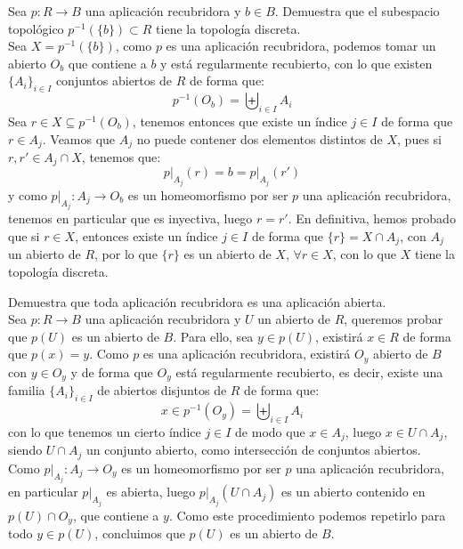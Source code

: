\begin{ejercicio}\label{ej:1_top_triv}
    Sea $p:R\to B$ una aplicación recubridora y $b\in B$. Demuestra que el subespacio topológico $p^{-1}(\{b\})\subset R$ tiene la topología discreta.\\

    \noindent
    Sea $X = p^{-1}(\{b\})$, como $p$ es una aplicación recubridora, podemos tomar un abierto $O_b$ que contiene a $b$ y está regularmente recubierto, con lo que existen $\{A_i\}_{i \in I}$ conjuntos abiertos de $R$ de forma que:
    \begin{equation*}
        p^{-1}(O_b) = \biguplus_{i \in I}A_i
    \end{equation*}
    Sea $r\in X\subseteq p^{-1}(O_b)$, tenemos entonces que existe un índice $j\in I$ de forma que $r\in A_j$. Veamos que $A_j$ no puede contener dos elementos distintos de $X$, pues si $r,r'\in A_j\cap X$, tenemos que:
    \begin{equation*}
        p\big|_{A_j}(r) = b = p\big|_{A_j}(r') 
    \end{equation*}
    y como $p\big|_{A_j}:A_j\to O_b$ es un homeomorfismo por ser $p$ una aplicación recubridora, tenemos en particular que es inyectiva, luego $r = r'$. En definitiva, hemos probado que si $r\in X$, entonces existe un índice $j\in I$ de forma que $\{r\} = X\cap A_j$, con $A_j$ un abierto de $R$, por lo que $\{r\}$ es un abierto de $X$, $\forall r\in X$, con lo que $X$ tiene la topología discreta.
\end{ejercicio}

\begin{ejercicio}\label{ej:1_recubridora_abierta}
    Demuestra que toda aplicación recubridora es una aplicación abierta.\\

    \noindent
    Sea $p:R\to B$ una aplicación recubridora y $U$ un abierto de $R$, queremos probar que $p(U)$ es un abierto de $B$. Para ello, sea $y\in p(U)$, existirá $x\in R$ de forma que $p(x) = y$. Como $p$ es una aplicación recubridora, existirá $O_y$ abierto de $B$ con $y\in O_y$ y de forma que $O_y$ está regularmente recubierto, es decir, existe una familia $\{A_i\}_{i \in I}$ de abiertos disjuntos de $R$ de forma que:
    \begin{equation*}
        x\in p^{-1}(O_y) = \biguplus_{i \in I}A_i
    \end{equation*}
    con lo que tenemos un cierto índice $j \in I$ de modo que $x\in A_j$, luego $x\in U\cap A_j$, siendo $U\cap A_j$ un conjunto abierto, como intersección de conjuntos abiertos. Como $p\big|_{A_j}:A_j\to O_y$ es un homeomorfismo por ser $p$ una aplicación recubridora, en particular $p\big|_{A_j}$ es abierta, luego $p\big|_{A_j}(U\cap A_j)$ es un abierto contenido en $p(U)\cap O_y$, que contiene a $y$. Como este procedimiento podemos repetirlo para todo $y\in p(U)$, concluimos que $p(U)$ es un abierto de $B$.
\end{ejercicio}

